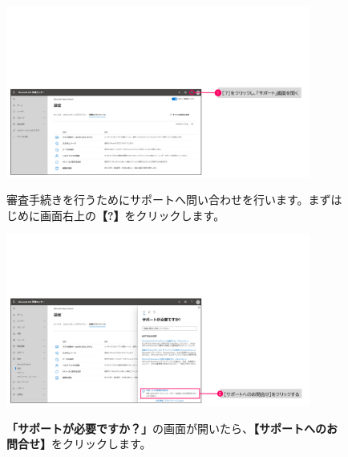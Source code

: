 \begin{figure}[h]
    \begin{minipage}{0.6\textwidth}
        \vspace{-2cm}
        \includegraphics[width=10cm]{figures/O365A1_request00.png}
    \end{minipage}
    \begin{minipage}{0.4\textwidth}
       審査手続きを行うためにサポートへ問い合わせを行います。まずはじめに画面右上の\textbf{【?】}をクリックします。
    \end{minipage}
\end{figure}

\begin{figure}[h]
    \begin{minipage}{0.6\textwidth}
        \vspace{-1cm}
        \includegraphics[width=10cm]{figures/O365A1_request01.png}
    \end{minipage}
    \begin{minipage}{0.4\textwidth}
       \textbf{「サポートが必要ですか？」}の画面が開いたら、\textbf{【サポートへのお問合せ】}をクリックします。
    \end{minipage}
\end{figure}

